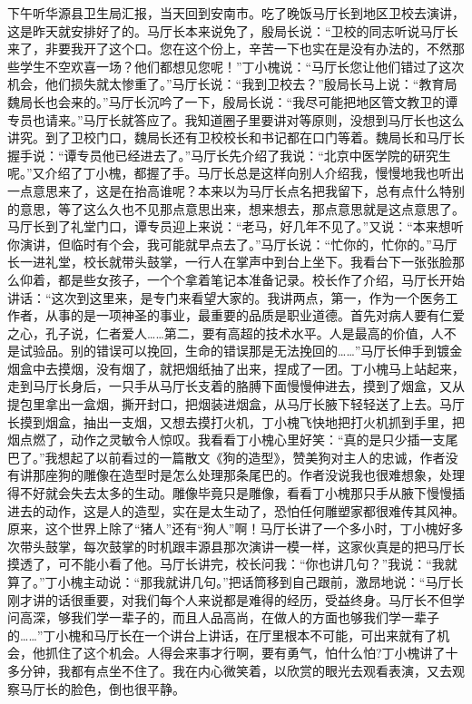 \documentclass[12pt,oneside]{book}
\begin{document}
下午听华源县卫生局汇报，当天回到安南市。吃了晚饭马厅长到地区卫校去演讲，这是昨天就安排好了的。马厅长本来说免了，殷局长说：``卫校的同志听说马厅长来了，非要我开了这个口。您在这个份上，辛苦一下也实在是没有办法的，不然那些学生不空欢喜一场？他们都想见您呢！''丁小槐说：``马厅长您让他们错过了这次机会，他们损失就太惨重了。''马厅长说：``我到卫校去？''殷局长马上说：``教育局魏局长也会来的。''马厅长沉吟了一下，殷局长说：``我尽可能把地区管文教卫的谭专员也请来。''马厅长就答应了。我知道圈子里要讲对等原则，没想到马厅长也这么讲究。到了卫校门口，魏局长还有卫校校长和书记都在口门等着。魏局长和马厅长握手说：``谭专员他已经进去了。''马厅长先介绍了我说：``北京中医学院的研究生呢。''又介绍了丁小槐，都握了手。马厅长总是这样向别人介绍我，慢慢地我也听出一点意思来了，这是在抬高谁呢？本来以为马厅长点名把我留下，总有点什么特别的意思，等了这么久也不见那点意思出来，想来想去，那点意思就是这点意思了。马厅长到了礼堂门口，谭专员迎上来说：``老马，好几年不见了。''又说：``本来想听你演讲，但临时有个会，我可能就早点去了。''马厅长说：``忙你的，忙你的。''马厅长一进礼堂，校长就带头鼓掌，一行人在掌声中到台上坐下。我看台下一张张脸那么仰着，都是些女孩子，一个个拿着笔记本准备记录。校长作了介绍，马厅长开始讲话：``这次到这里来，是专门来看望大家的。我讲两点，第一，作为一个医务工作者，从事的是一项神圣的事业，最重要的品质是职业道德。首先对病人要有仁爱之心，孔子说，仁者爱人\ldots\ldots 第二，要有高超的技术水平。人是最高的价值，人不是试验品。别的错误可以挽回，生命的错误那是无法挽回的\ldots\ldots{}''马厅长伸手到镀金烟盒中去摸烟，没有烟了，就把烟纸抽了出来，捏成了一团。丁小槐马上站起来，走到马厅长身后，一只手从马厅长支着的胳膊下面慢慢伸进去，摸到了烟盒，又从提包里拿出一盒烟，撕开封口，把烟装进烟盒，从马厅长腋下轻轻送了上去。马厅长摸到烟盒，抽出一支烟，又想去摸打火机，丁小槐飞快地把打火机抓到手里，把烟点燃了，动作之灵敏令人惊叹。我看看丁小槐心里好笑：``真的是只少插一支尾巴了。''我想起了以前看过的一篇散文《狗的造型》，赞美狗对主人的忠诚，作者没有讲那座狗的雕像在造型时是怎么处理那条尾巴的。作者没说我也很难想象，处理得不好就会失去太多的生动。雕像毕竟只是雕像，看看丁小槐那只手从腋下慢慢插进去的动作，这是人的造型，实在是太生动了，恐怕任何雕塑家都很难传其风神。原来，这个世界上除了``猪人''还有``狗人''啊！马厅长讲了一个多小时，丁小槐好多次带头鼓掌，每次鼓掌的时机跟丰源县那次演讲一模一样，这家伙真是的把马厅长摸透了，可不能小看了他。马厅长讲完，校长问我：``你也讲几句？''我说：``我就算了。''丁小槐主动说：``那我就讲几句。''把话筒移到自己跟前，激昂地说：``马厅长刚才讲的话很重要，对我们每个人来说都是难得的经历，受益终身。马厅长不但学问高深，够我们学一辈子的，而且人品高尚，在做人的方面也够我们学一辈子的\ldots\ldots{}''丁小槐和马厅长在一个讲台上讲话，在厅里根本不可能，可出来就有了机会，他抓住了这个机会。人得会来事才行啊，要有勇气，怕什么怕?丁小槐讲了十多分钟，我都有点坐不住了。我在内心微笑着，以欣赏的眼光去观看表演，又去观察马厅长的脸色，倒也很平静。
\end{document}
